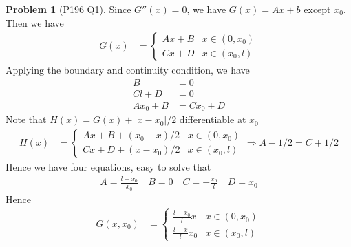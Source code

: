 \documentclass[twoside,11pt]{article}
\theoremstyle{definition}
\newtheorem{problem}{Problem}
\theoremstyle{remark}
\begin{document}
\begin{problem}[P196 Q1]
Since $G''(x)=0$, we have $G(x)=Ax + b$ except $x_0$.
Then we have
\begin{align*}
    G(x) &= \begin{cases}
        Ax + B & x\in(0, x_0)\\
        Cx + D & x\in(x_0, l)
    \end{cases}
\end{align*}
Applying the boundary and continuity condition, we have
\begin{align*}
    B &= 0\\
    Cl + D &= 0\\
    Ax_0 + B &= Cx_0 + D
\end{align*}
Note that $H(x)=G(x) + |x-x_0|/2$ differentiable at $x_0$
\begin{align*}
    H(x) &= 
    \begin{cases}
        Ax + B + (x_0-x)/2 & x\in(0, x_0)\\
        Cx + D + (x-x_0)/2 & x\in(x_0, l)
    \end{cases}
    \Rightarrow
    A - 1/2 = C + 1/2
\end{align*}
Hence we have four equations, easy to solve that
\begin{align*}
    A = \frac{l-x_0}{x_0}\quad
    B = 0\quad
    C = -\frac{x_0}{l}\quad
    D = x_0
\end{align*}
Hence
\begin{align*}
    G(x, x_0) &= 
    \begin{cases}
        \frac{l-x_0}{l}x & x\in (0, x_0)\\
        \frac{l-x}{l}x_0 & x\in(x_0, l)
    \end{cases}
\end{align*}

\end{problem}
\end{document}
